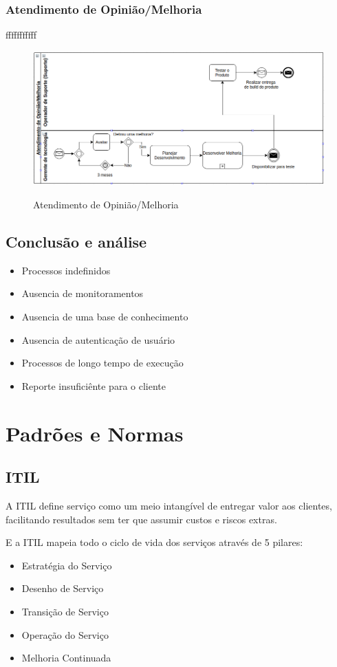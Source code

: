 \documentclass[11pt,a4paper]{article}
\begin{document}
\subsubsection{Atendimento de Opinião/Melhoria}
fffffffffff
\begin{figure}[!h]
\caption{Atendimento de Opinião/Melhoria}
\centering %
\includegraphics[width=15cm]{as-is/04_atendimento_de_melhoria.png}
\label{figura:atendimento_de_melhoria_as_is}
\end{figure}


\subsection{Conclusão e análise}
\begin{itemize}[noitemsep]
  \item Processos indefinidos
  \item Ausencia de monitoramentos
  \item Ausencia de uma base de conhecimento
  \item Ausencia de autenticação de usuário
  \item Processos de longo tempo de execução
  \item Reporte insuficiênte para o cliente
\end{itemize}

\section{Padrões e Normas}
\subsection{ITIL}
A ITIL define serviço como um meio intangível de entregar valor aos clientes,
facilitando resultados sem ter que assumir custos e riscos extras.

E a ITIL mapeia todo o ciclo de vida dos serviços através de 5 pilares:
\begin{itemize}[noitemsep]
  \item Estratégia do Serviço
  \item Desenho de Serviço
  \item Transição de Serviço
  \item Operação do Serviço
  \item Melhoria Continuada
\end{itemize}
\end{document}
